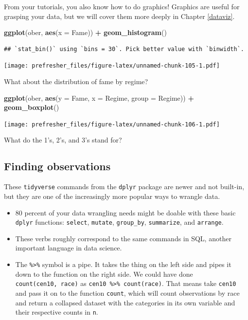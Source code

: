 \documentclass[
]{book}
\newenvironment{Shaded}{\begin{snugshade}}{\end{snugshade}}
\newcommand{\DataTypeTok}[1]{\textcolor[rgb]{0.13,0.29,0.53}{#1}}
\newcommand{\KeywordTok}[1]{\textcolor[rgb]{0.13,0.29,0.53}{\textbf{#1}}}
\newcommand{\NormalTok}[1]{#1}
\newcommand{\OperatorTok}[1]{\textcolor[rgb]{0.81,0.36,0.00}{\textbf{#1}}}
\newcommand{\StringTok}[1]{\textcolor[rgb]{0.31,0.60,0.02}{#1}}
\providecommand{\tightlist}{%
  \setlength{\itemsep}{0pt}\setlength{\parskip}{0pt}}
\theoremstyle{definition}
\theoremstyle{definition}
\theoremstyle{definition}
\theoremstyle{remark}
\begin{document}
From your tutorials, you also know how to do graphics! Graphics are useful for grasping your data, but we will cover them more deeply in Chapter \ref{dataviz}.

\begin{Shaded}
\begin{Highlighting}[]
\KeywordTok{ggplot}\NormalTok{(ober, }\KeywordTok{aes}\NormalTok{(}\DataTypeTok{x =}\NormalTok{ Fame)) }\OperatorTok{+}\StringTok{ }\KeywordTok{geom\_histogram}\NormalTok{()}
\end{Highlighting}
\end{Shaded}

\begin{verbatim}
## `stat_bin()` using `bins = 30`. Pick better value with `binwidth`.
\end{verbatim}

\texttt{[image: prefresher\_files/figure-latex/unnamed-chunk-105-1.pdf]}

What about the distribution of fame by regime?

\begin{Shaded}
\begin{Highlighting}[]
\KeywordTok{ggplot}\NormalTok{(ober, }\KeywordTok{aes}\NormalTok{(}\DataTypeTok{y =}\NormalTok{ Fame, }\DataTypeTok{x =}\NormalTok{ Regime, }\DataTypeTok{group =}\NormalTok{ Regime)) }\OperatorTok{+}
\StringTok{  }\KeywordTok{geom\_boxplot}\NormalTok{()}
\end{Highlighting}
\end{Shaded}

\texttt{[image: prefresher\_files/figure-latex/unnamed-chunk-106-1.pdf]}

What do the 1's, 2's, and 3's stand for?

\hypertarget{finding-observations}{%
\subsection{Finding observations}\label{finding-observations}}

These \texttt{tidyverse} commands from the \texttt{dplyr} package are newer and not built-in, but they are one of the increasingly more popular ways to wrangle data.

\begin{itemize}
\tightlist
\item
  80 percent of your data wrangling needs might be doable with these basic \texttt{dplyr} functions: \texttt{select}, \texttt{mutate}, \texttt{group\_by}, \texttt{summarize}, and \texttt{arrange}.
\item
  These verbs roughly correspond to the same commands in SQL, another important language in data science.
\item
  The \texttt{\%\textgreater{}\%} symbol is a pipe. It takes the thing on the left side and pipes it down to the function on the right side. We could have done \texttt{count(cen10,\ race)} as \texttt{cen10\ \%\textgreater{}\%\ count(race)}. That means take \texttt{cen10} and pass it on to the function \texttt{count}, which will count observations by race and return a collapsed dataset with the categories in its own variable and their respective counts in \texttt{n}.
\end{itemize}
\end{document}
